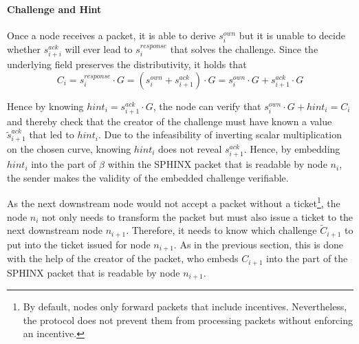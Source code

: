 \paragraph{Challenge and Hint}
\label{sec:proofofrelay:challenge}

Once a node receives a packet, it is able to derive $s_i^{own}$ but it is unable to decide whether $s_{i+i}^{ack}$ will ever lead to $s_i^{response}$ that solves the challenge. Since the underlying field preserves the distributivity, it holds that $$C_i = s_i^{response} \cdot G = (s_i^{own} + s_{i+1}^{ack}) \cdot G = s_i^{own} \cdot G + s_{i+1}^{ack} \cdot G$$

Hence by knowing $hint_i = s_{i+1}^{ack} \cdot G$, the node can verify that $s_i^{own} \cdot G + hint_i = C_i$ and thereby check that the creator of the challenge must have known a value $\tilde{s}_{i+1}^{ack}$ that led to $hint_i$. Due to the infeasibility of inverting scalar multiplication on the chosen curve, knowing $hint_i$ does not reveal $s_{i+1}^{ack}$. Hence, by embedding $hint_i$ into the part of $\beta$ within the SPHINX packet that is readable by node $n_i$, the sender makes the validity of the embedded challenge verifiable.

As the next downstream node would not accept a packet without a ticket\footnote{By default, nodes only forward packets that include incentives. Nevertheless, the protocol does not prevent them from processing packets without enforcing an incentive.}, the node $n_i$ not only needs to transform the packet but must also issue a ticket to the next downstream node $n_{i+1}$. Therefore, it needs to know which challenge $\tilde{C}_{i+1}$ to put into the ticket issued for node $n_{i+1}$. As in the previous section, this is done with the help of the creator of the packet, who embeds $C_{i+1}$ into the part of the SPHINX packet that is readable by node $n_{i+1}$.

